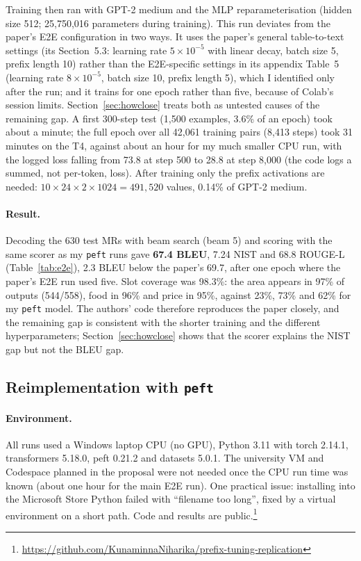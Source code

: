 \documentclass[11pt]{article}
\begin{document}
Training then ran with GPT-2 medium and the MLP reparameterisation (hidden size 512; 25,750,016 parameters during training). This run deviates from the paper's E2E configuration in two ways. It uses the paper's general table-to-text settings (its Section~5.3: learning rate $5\times10^{-5}$ with linear decay, batch size 5, prefix length 10) rather than the E2E-specific settings in its appendix Table~5 (learning rate $8\times10^{-5}$, batch size 10, prefix length 5), which I identified only after the run; and it trains for one epoch rather than five, because of Colab's session limits. Section~\ref{sec:howclose} treats both as untested causes of the remaining gap. A first 300-step test (1,500 examples, 3.6\% of an epoch) took about a minute; the full epoch over all 42,061 training pairs (8,413 steps) took 31 minutes on the T4, against about an hour for my much smaller CPU run, with the logged loss falling from 73.8 at step 500 to 28.8 at step 8,000 (the code logs a summed, not per-token, loss). After training only the prefix activations are needed: $10 \times 24 \times 2 \times 1024 = 491{,}520$ values, 0.14\% of GPT-2 medium.

\paragraph{Result.} Decoding the 630 test MRs with beam search (beam 5) and scoring with the same scorer as my \texttt{peft} runs gave \textbf{67.4 BLEU}, 7.24 NIST and 68.8 ROUGE-L (Table~\ref{tab:e2e}), 2.3 BLEU below the paper's 69.7, after one epoch where the paper's E2E run used five. Slot coverage was 98.3\%: the area appears in 97\% of outputs (544/558), food in 96\% and price in 95\%, against 23\%, 73\% and 62\% for my \texttt{peft} model. The authors' code therefore reproduces the paper closely, and the remaining gap is consistent with the shorter training and the different hyperparameters; Section~\ref{sec:howclose} shows that the scorer explains the NIST gap but not the BLEU gap.


\subsection{Reimplementation with \texttt{peft}}\label{sec:peft}
\paragraph{Environment.} All runs used a Windows laptop CPU (no GPU), Python 3.11 with torch 2.14.1, transformers 5.18.0, peft 0.21.2 and datasets 5.0.1. The university VM and Codespace planned in the proposal were not needed once the CPU run time was known (about one hour for the main E2E run). One practical issue: installing into the Microsoft Store Python failed with ``filename too long'', fixed by a virtual environment on a short path. Code and results are public.\footnote{\url{https://github.com/KunaminnaNiharika/prefix-tuning-replication}}
\end{document}

